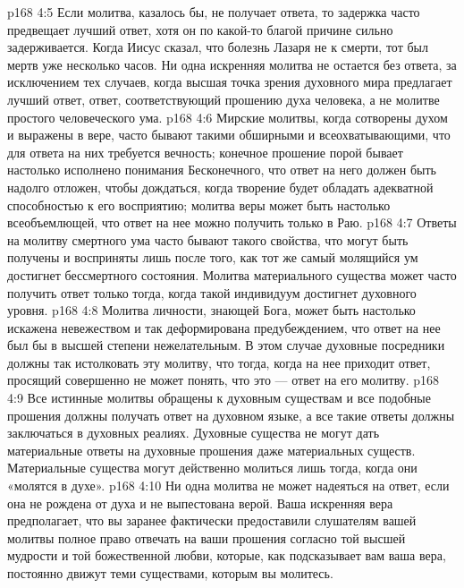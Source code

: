 \vs p168 4:5 \pc {}\bibnobreakspace Если молитва, казалось бы, не получает ответа, то задержка часто предвещает лучший ответ, хотя он по какой\hyp{}то благой причине сильно задерживается. Когда Иисус сказал, что болезнь Лазаря не к смерти, тот был мертв уже несколько часов. Ни одна искренняя молитва не остается без ответа, за исключением тех случаев, когда высшая точка зрения духовного мира предлагает лучший ответ, ответ, соответствующий прошению духа человека, а не молитве простого человеческого ума.
\vs p168 4:6 \pc {}\bibnobreakspace Мирские молитвы, когда сотворены духом и выражены в вере, часто бывают такими обширными и всеохватывающими, что для ответа на них требуется вечность; конечное прошение порой бывает настолько исполнено понимания Бесконечного, что ответ на него должен быть надолго отложен, чтобы дождаться, когда творение будет обладать адекватной способностью к его восприятию; молитва веры может быть настолько всеобъемлющей, что ответ на нее можно получить только в Раю.
\vs p168 4:7 \pc {}\bibnobreakspace Ответы на молитву смертного ума часто бывают такого свойства, что могут быть получены и восприняты лишь после того, как тот же самый молящийся ум достигнет бессмертного состояния. Молитва материального существа может часто получить ответ только тогда, когда такой индивидуум достигнет духовного уровня.
\vs p168 4:8 \pc {}\bibnobreakspace Молитва личности, знающей Бога, может быть настолько искажена невежеством и так деформирована предубеждением, что ответ на нее был бы в высшей степени нежелательным. В этом случае духовные посредники должны так истолковать эту молитву, что тогда, когда на нее приходит ответ, просящий совершенно не может понять, что это --- ответ на его молитву.
\vs p168 4:9 \pc {}\bibnobreakspace Все истинные молитвы обращены к духовным существам и все подобные прошения должны получать ответ на духовном языке, а все такие ответы должны заключаться в духовных реалиях. Духовные существа не могут дать материальные ответы на духовные прошения даже материальных существ. Материальные существа могут действенно молиться лишь тогда, когда они «молятся в духе».
\vs p168 4:10 \pc {}\bibnobreakspace Ни одна молитва не может надеяться на ответ, если она не рождена от духа и не выпестована верой. Ваша искренняя вера предполагает, что вы заранее фактически предоставили слушателям вашей молитвы полное право отвечать на ваши прошения согласно той высшей мудрости и той божественной любви, которые, как подсказывает вам ваша вера, постоянно движут теми существами, которым вы молитесь.
